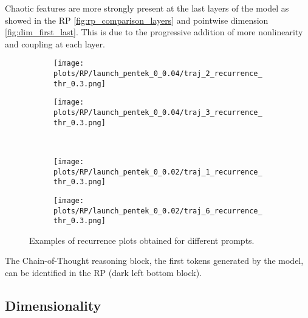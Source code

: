 \documentclass[a4paper,12pt]{article}
\begin{document}
Chaotic features are more strongly present at the last layers of the model as showed in the RP \ref{fig:rp_comparison_layers} and pointwise dimension \ref{fig:dim_first_last}. This is due to the progressive addition of more nonlinearity and coupling at each layer. 

\begin{figure}[H]
    \centering
    \begin{subfigure}[b]{0.48\textwidth}
        \centering
        \texttt{[image: plots/RP/launch\_pentek\_0\_0.04/traj\_2\_recurrence\_thr\_0.3.png]}
    \end{subfigure}\hfill
    \begin{subfigure}[b]{0.48\textwidth}
        \centering
        \texttt{[image: plots/RP/launch\_pentek\_0\_0.04/traj\_3\_recurrence\_thr\_0.3.png]}
    \end{subfigure}
    \\[0.5em]
    \begin{subfigure}[b]{0.48\textwidth}
        \centering
        \texttt{[image: plots/RP/launch\_pentek\_0\_0.02/traj\_1\_recurrence\_thr\_0.3.png]}
    \end{subfigure}\hfill
    \begin{subfigure}[b]{0.48\textwidth}
        \centering
        \texttt{[image: plots/RP/launch\_pentek\_0\_0.02/traj\_6\_recurrence\_thr\_0.3.png]}
    \end{subfigure}
    \caption{Examples of recurrence plots obtained for different prompts.}
    \label{fig:rp_interesting}
\end{figure}

The Chain-of-Thought reasoning block, the first tokens generated by the model, can be identified in the RP (dark left bottom block).


\subsection{Dimensionality}
\end{document}
